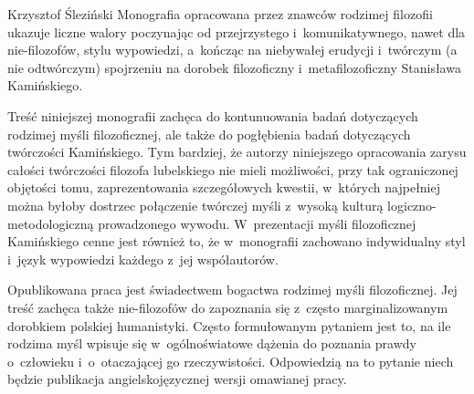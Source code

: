 \begin{recplenv}{Krzysztof Śleziński}
Monografia opracowana przez znawców rodzimej filozofii ukazuje liczne walory poczynając od przejrzystego i~komunikatywnego,
nawet dla nie-filozofów, stylu wypowiedzi, a~kończąc na niebywałej erudycji i~twórczym (a nie
odtwórczym) spojrzeniu na dorobek filozoficzny i~metafilozoficzny Stanisława Kamińskiego.

Treść niniejszej monografii zachęca do kontunuowania badań dotyczących rodzimej myśli filozoficznej, ale także do
pogłębienia badań dotyczących twórczości Kamińskiego. Tym bardziej, że autorzy niniejszego opracowania zarysu całości
twórczości filozofa lubelskiego nie mieli możliwości, przy tak ograniczonej objętości tomu, zaprezentowania
szczegółowych kwestii, w~których najpełniej można byłoby dostrzec połączenie twórczej myśli z~wysoką kulturą
logiczno-metodologiczną prowadzonego wywodu. W~prezentacji myśli filozoficznej Kamińskiego cenne jest również to,
że w~monografii zachowano indywidualny styl i~język wypowiedzi każdego z~jej współautorów. 

Opublikowana praca jest świadectwem bogactwa rodzimej myśli filozoficznej. Jej treść zachęca także nie-filozofów do
zapoznania się z~często marginalizowanym dorobkiem polskiej humanistyki. Często formułowanym pytaniem jest to, na ile
rodzima myśl wpisuje się w~ogólnoświatowe dążenia do poznania prawdy o~człowieku i~o~otaczającej go rzeczywistości.
Odpowiedzią na to pytanie niech będzie publikacja angielskojęzycznej wersji omawianej pracy.


\end{recplenv}
